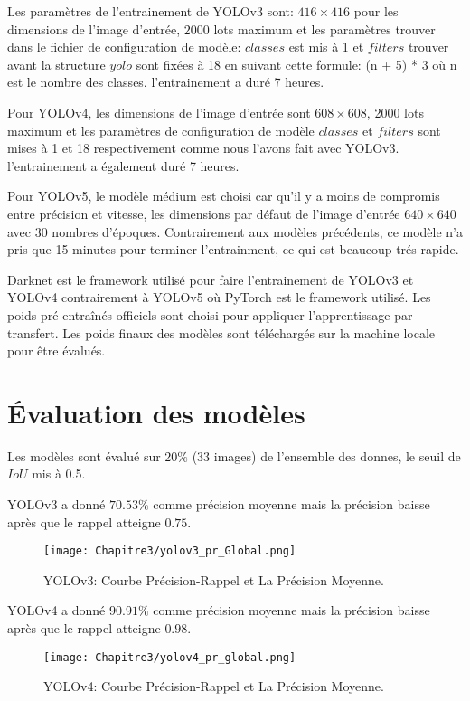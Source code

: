      Les paramètres de l'entrainement de YOLOv3 sont: $416\times416$ pour les dimensions de l'image d'entrée, $2000$ lots maximum et les paramètres trouver dans le fichier de configuration de modèle: $classes$ est mis à 1 et $filters$ trouver avant la structure $yolo$ sont fixées à 18 en suivant cette formule: (n + 5) * 3 où n est le nombre des classes. l'entrainement a duré 7 heures.
     
     Pour YOLOv4, les dimensions de l'image d'entrée sont $608\times608$, 2000 lots maximum et les paramètres de configuration de modèle $classes$ et $filters$ sont mises à 1 et 18 respectivement comme nous l'avons fait avec YOLOv3. l'entrainement a également duré 7 heures.
     
     Pour YOLOv5, le modèle médium est choisi car qu'il y a moins de compromis entre précision et vitesse, les dimensions par défaut de l'image d'entrée $640\times640$ avec 30 nombres d'époques. Contrairement aux modèles précédents, ce modèle n'a pris que 15 minutes pour terminer l'entrainment, ce qui est beaucoup trés rapide.

     Darknet est le framework utilisé pour faire l'entrainement de YOLOv3 et YOLOv4 contrairement à YOLOv5 où PyTorch est le framework utilisé. Les poids pré-entraînés officiels sont choisi pour appliquer l'apprentissage par transfert. Les poids finaux des modèles sont téléchargés sur la machine locale pour être évalués.
     

\section{Évaluation des modèles}
     Les modèles sont évalué sur $20\%$ (33 images) de l'ensemble des donnes, le seuil de $IoU$ mis à 0.5.
     
     YOLOv3 a donné $70.53\%$ comme précision moyenne mais la précision baisse après que le rappel atteigne $0.75$.
     \begin{figure}[H]
               \centering
               \texttt{[image: Chapitre3/yolov3\_pr\_Global.png]}
               \caption{YOLOv3: Courbe Précision-Rappel et La Précision Moyenne.}
               \label{y3_pr}
               \end{figure}

     YOLOv4 a donné $90.91\%$ comme précision moyenne mais la précision baisse après que le rappel atteigne $0.98$.
     \begin{figure}[H]
               \centering
               \texttt{[image: Chapitre3/yolov4\_pr\_global.png]}
               \caption{YOLOv4: Courbe Précision-Rappel et La Précision Moyenne.}
               \label{y4_pr}
               \end{figure}

